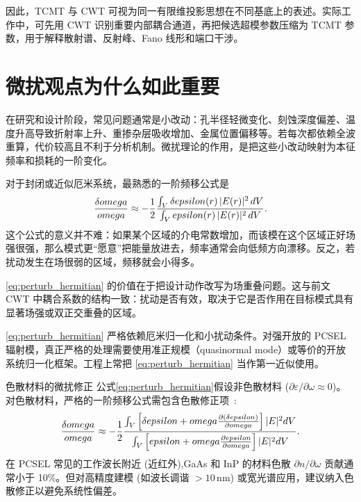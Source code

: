 因此，TCMT 与 CWT 可视为同一有限维投影思想在不同基底上的表述。实际工作中，可先用 CWT 识别重要内部耦合通道，再把候选超模参数压缩为 TCMT 参数，用于解释散射谱、反射峰、Fano 线形和端口干涉。

\section{微扰观点为什么如此重要}
在研究和设计阶段，常见问题通常是小改动：孔半径轻微变化、刻蚀深度偏差、温度升高导致折射率上升、重掺杂层吸收增加、金属位置偏移等。若每次都依赖全波重算，代价较高且不利于分析机制。微扰理论的作用，是把这些小改动映射为本征频率和损耗的一阶变化。

对于封闭或近似厄米系统，最熟悉的一阶频移公式是
\begin{equation}
\frac{\delta omega}{omega}
\approx
-
\frac{1}{2}
\frac{\int_V \delta epsilon(r)\,|E(r)|^2\,d V}
{\int_V epsilon(r)\,|E(r)|^2\,d V}.
\label{eq:perturb_hermitian}
\end{equation}
这个公式的意义并不难：如果某个区域的介电常数增加，而该模在这个区域正好场强很强，那么模式更“愿意”把能量放进去，频率通常会向低频方向漂移。反之，若扰动发生在场很弱的区域，频移就会小得多。

\cref{eq:perturb_hermitian} 的价值在于把设计动作改写为场重叠问题。这与前文 CWT 中耦合系数的结构一致：扰动是否有效，取决于它是否作用在目标模式具有显著场强或双正交重叠的区域。

\cref{eq:perturb_hermitian} 严格依赖厄米归一化和小扰动条件。对强开放的 PCSEL 辐射模，真正严格的处理需要使用准正规模（quasinormal mode）或等价的开放系统归一化框架。工程上常把 \cref{eq:perturb_hermitian} 当作第一近似使用。

\begin{NoteBox}{色散材料的微扰修正}
公式\ref{eq:perturb_hermitian}假设非色散材料 ($\partial\varepsilon/\partial\omega \approx 0$)。对色散材料，严格的一阶频移公式需包含色散修正项~\cite{sauvan2013qnm,alpeggiani2017qnm}:
\begin{equation}
\frac{\delta omega}{omega} \approx -\frac{1}{2} \frac{\int_V \left[\delta epsilon + omega\frac{\partial(\delta epsilon)}{\partial omega}\right]|E|^2d V}{\int_V \left[epsilon + omega\frac{\partial epsilon}{\partial omega}\right]|E|^2d V}.
\label{eq:perturb_dispersion}
\end{equation}
在 PCSEL 常见的工作波长附近 (近红外),GaAs 和 InP 的材料色散 $\partial n/\partial\omega$ 贡献通常小于 10\%。但对高精度建模 (如波长调谐 $>10\,\mathrm{nm}$) 或宽光谱应用，建议纳入色散修正以避免系统性偏差。
\end{NoteBox}


